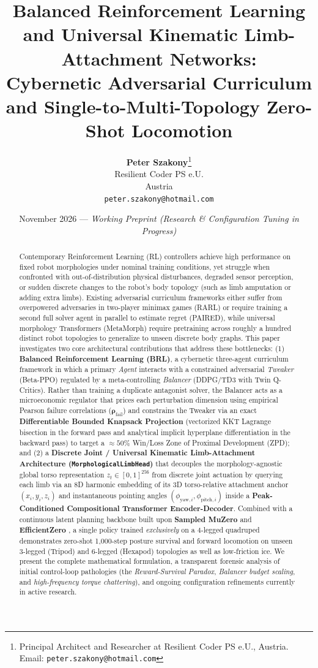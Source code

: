 \documentclass[11pt,a4paper]{article}
\title{\textbf{Balanced Reinforcement Learning and Universal Kinematic Limb-Attachment Networks:\\Cybernetic Adversarial Curriculum and Single-to-Multi-Topology Zero-Shot Locomotion}}
\author{
  \textbf{Peter Szakony}\thanks{Principal Architect and Researcher at Resilient Coder PS e.U., Austria. Email: \texttt{peter.szakony@hotmail.com}} \\
  Resilient Coder PS e.U. \\
  Austria \\
  \texttt{peter.szakony@hotmail.com}
}
\date{November 2026 --- \emph{Working Preprint (Research \& Configuration Tuning in Progress)}}
\begin{document}
\maketitle

\begin{abstract}
Contemporary Reinforcement Learning (RL) controllers achieve high performance on fixed robot morphologies under nominal training conditions, yet struggle when confronted with out-of-distribution physical disturbances, degraded sensor perception, or sudden discrete changes to the robot's body topology (such as limb amputation or adding extra limbs). Existing adversarial curriculum frameworks either suffer from overpowered adversaries in two-player minimax games (RARL) or require training a second full solver agent in parallel to estimate regret (PAIRED), while universal morphology Transformers (MetaMorph) require pretraining across roughly a hundred distinct robot topologies to generalize to unseen discrete body graphs. This paper investigates two core architectural contributions that address these bottlenecks:
(1) \textbf{Balanced Reinforcement Learning (BRL)}, a cybernetic three-agent curriculum framework in which a primary \emph{Agent} interacts with a constrained adversarial \emph{Tweaker} (Beta-PPO) regulated by a meta-controlling \emph{Balancer} (DDPG/TD3 with Twin Q-Critics). Rather than training a duplicate antagonist solver, the Balancer acts as a microeconomic regulator that prices each perturbation dimension using empirical Pearson failure correlations ($\boldsymbol{\rho}_{\text{fail}}$) and constrains the Tweaker via an exact \textbf{Differentiable Bounded Knapsack Projection} (vectorized KKT Lagrange bisection in the forward pass and analytical implicit hyperplane differentiation in the backward pass) to target a $\approx 50\%$ Win/Loss Zone of Proximal Development (ZPD); and
(2) a \textbf{Discrete Joint / Universal Kinematic Limb-Attachment Architecture (\texttt{MorphologicalLimbHead})} that decouples the morphology-agnostic global torso representation $z_t \in [0, 1]^{256}$ from discrete joint actuation by querying each limb via an 8D harmonic embedding of its 3D torso-relative attachment anchor $(x_i, y_i, z_i)$ and instantaneous pointing angles $(\phi_{\text{yaw},i}, \phi_{\text{pitch},i})$ inside a \textbf{Peak-Conditioned Compositional Transformer Encoder-Decoder}.
Combined with a continuous latent planning backbone built upon \textbf{Sampled MuZero} \cite{hubert2021learning} and \textbf{EfficientZero} \cite{ye2021mastering}, a single policy trained \emph{exclusively} on a 4-legged quadruped demonstrates zero-shot 1,000-step posture survival and forward locomotion on unseen 3-legged (Tripod) and 6-legged (Hexapod) topologies as well as low-friction ice. We present the complete mathematical formulation, a transparent forensic analysis of initial control-loop pathologies (the \emph{Reward-Survival Paradox}, \emph{Balancer budget scaling}, and \emph{high-frequency torque chattering}), and ongoing configuration refinements currently in active research.
\end{abstract}
\end{document}
